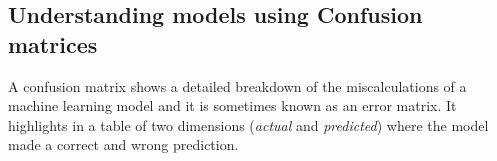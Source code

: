 \documentclass[a4paper,12pt]{report}
\begin{document}
		\subsection{Understanding models using Confusion matrices}
		A confusion matrix shows a detailed breakdown of the miscalculations of a machine learning model and it is sometimes known as an error matrix. It highlights in a table of two dimensions (\textit{actual} and \textit{predicted}) where the model made a correct and wrong prediction. 
		
\end{document}
